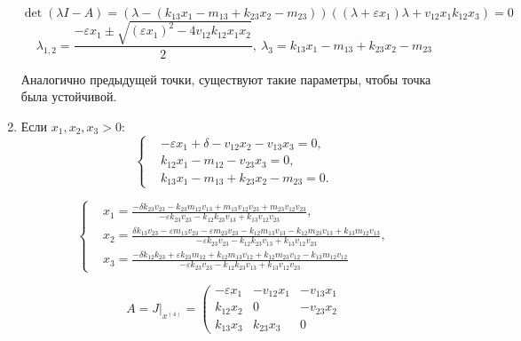 \begin{enumerate}
            \[
                \det(\lambda I - A) = \left( \lambda - \left( k_{13} x_1 - m_{13} + k_{23} x_2 - m_{23} \right) \right) \left( (\lambda + \varepsilon x_1)\lambda + v_{12} x_1 k_{12} x_3 \right) = 0
            \]
            \[
                \lambda_{1,2} = \frac{-\varepsilon x_1 \pm \sqrt{ (\varepsilon x_1)^2 - 4 v_{12} k_{12} x_1 x_2 } }{2}, ~ 
                \lambda_3 = k_{13} x_1 - m_{13} + k_{23} x_2 - m_{23}
            \]

            Аналогично предыдущей точки, существуют такие параметры, чтобы точка была устойчивой.

        \item Если \( x_1, x_2, x_3 > 0 \):
            \[
                \left\{\begin{split}
                    & -\varepsilon x_1 + \delta - v_{12} x_2 - v_{13} x_3 = 0, \\
                    & k_{12} x_1 - m_{12} - v_{23} x_3 = 0, \\
                    & k_{13} x_1 - m_{13} + k_{23} x_2 - m_{23} = 0. 
                \end{split}\right.
            \]

            \[
                \left\{\begin{split}
                    & x_1 = \frac{-\delta k_{23} v_{23} - k_{23} m_{12} v_{13} + m_{13} v_{12} v_{23} + m_{23} v_{12} v_{23}}{-\varepsilon k_{23} v_{23} - k_{12} k_{23} v_{13} + k_{13} v_{12} v_{23}}, \\
                    & x_2 = \frac{\delta k_{13} v_{23} - \varepsilon m_{13} v_{23} - \varepsilon m_{23} v_{23} - k_{12} m_{13} v_{13} - k_{12} m_{23} v_{13} + k_{13} m_{12} v_{13}}{-\varepsilon k_{23} v_{23} - k_{12} k_{23} v_{13} + k_{13} v_{12} v_{23}}, \\
                    & x_3 = \frac{-\delta k_{12} k_{23} + \varepsilon k_{23} m_{12} + k_{12} m_{13} v_{12} + k_{12} m_{23} v_{12} - k_{13} m_{12} v_{12}}{-\varepsilon k_{23} v_{23} - k_{12} k_{23} v_{13} + k_{13} v_{12} v_{23}}
                \end{split}\right.
            \]

            \[
                A = J\big|_{x^{(4)}} = \left(
                    \begin{matrix}
                        -\varepsilon x_1 & -v_{12}  x_1  & -v_{13} x_1 \\
                        k_{12} x_2 & 0 & -v_{23} x_2 \\
                        k_{13} x_3 & k_{23} x_3 & 0


\end{matrix}\]
\end{enumerate}
